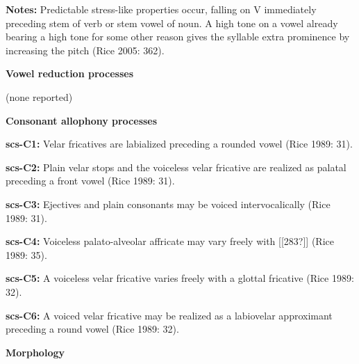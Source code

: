 \begin{styleBody}
\textbf{Notes:} Predictable stress-like properties occur, falling on V immediately preceding stem of verb or stem vowel of noun. A high tone on a vowel already bearing a high tone for some other reason gives the syllable extra prominence by increasing the pitch (Rice 2005: 362).
\end{styleBody}

\begin{styleBody}
\textbf{Vowel reduction processes}
\end{styleBody}

\begin{styleBody}
(none reported)
\end{styleBody}

\begin{styleBody}
\textbf{Consonant allophony processes}
\end{styleBody}

\begin{styleBody}
\textbf{scs-C1: }Velar fricatives are labialized preceding a rounded vowel (Rice 1989: 31).
\end{styleBody}

\begin{styleBody}
\textbf{scs-C2: }Plain velar stops and the voiceless velar fricative are realized as palatal preceding a front vowel (Rice 1989: 31).
\end{styleBody}

\begin{styleBody}
\textbf{scs-C3: }Ejectives and plain consonants may be voiced intervocalically (Rice 1989: 31).
\end{styleBody}

\begin{styleBody}
\textbf{scs-C4: }Voiceless palato-alveolar affricate may vary freely with [[283?]] (Rice 1989: 35).
\end{styleBody}

\begin{styleBody}
\textbf{scs-C5: }A voiceless velar fricative varies freely with a glottal fricative (Rice 1989: 32).
\end{styleBody}

\begin{styleBody}
\textbf{scs-C6: }A voiced velar fricative may be realized as a labiovelar approximant preceding a round vowel (Rice 1989: 32).
\end{styleBody}

\begin{styleBody}
\textbf{Morphology}
\end{styleBody}

